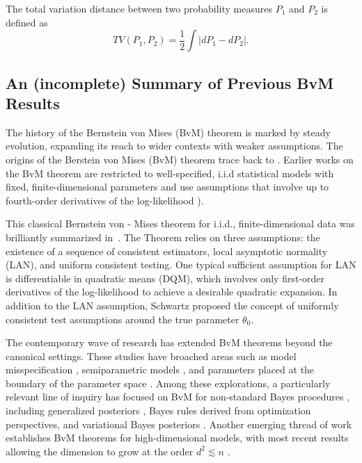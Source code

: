 \documentclass[twoside,11pt]{article}
\numberwithin{equation}{section}
\begin{document}
{\begin{definition}
The total variation distance between two probability measures $P_1$ and $P_2$ is defined as
\begin{equation*}
TV(P_1, P_2) = \frac{1}{2} \int |dP_1 - dP_2|.
\end{equation*}
\end{definition}



\subsection{An (incomplete) Summary of Previous BvM Results} \label{subsect:bvm-history}
The history of the Bernstein von Mises (BvM) theorem is marked by steady evolution, expanding its reach to wider contexts with weaker assumptions.  The origins of the Berstein von Mises (BvM) theorem trace back to \cite{Laplace1809}.  Earlier works on the BvM theorem are restricted to well-specified, i.i.d statistical models with fixed, finite-dimensional parameters and use assumptions that involve up to fourth-order derivatives of the log-likelihood \citep{LeCam1953, Bickel1969, LeCam2000}). 

This classical Bernstein von - Mises theorem for i.i.d., finite-dimensional data was brilliantly summarized in~\cite[Chapter 10]{VanderVaart2000}. The Theorem relies on three assumptions: the existence of a sequence of consistent estimators, local asymptotic normality (LAN), and uniform consistent testing. One typical sufficient assumption for LAN is differentiable in quadratic means (DQM), which involves only first-order derivatives of the log-likelihood to achieve a desirable quadratic expansion. In addition to the LAN assumption, Schwartz \cite{Schwartz1965} proposed the concept of uniformly consistent test assumptions around the true parameter $\theta_0$. 

The contemporary wave of research has extended BvM theorems beyond the canonical settings. These studies have broached areas such as model misspecification \citep{Kleijn2012}, semiparametric models \cite{Shen2002, Bickel2012, panov2015, Castillo2015}, and parameters placed at the boundary of the parameter space \citep{bochkina2014bernstein}. Among these explorations, a particularly relevant line of inquiry has focused on BvM for non-standard Bayes procedures \citep{knoblauch2022optimization}, including generalized posteriors \citep{miller2021asymptotic}, Bayes rules derived from optimization perspectives, and variational Bayes posteriors \citep{wang2019Frequentist, medina2022robustness}. Another emerging thread of work establishes BvM theorems for high-dimensional models, with most recent results allowing the dimension to grow at the order $d^2 \lesssim n$ \citep{panov2015,katsevich2023improved}.  

}
\end{document}
